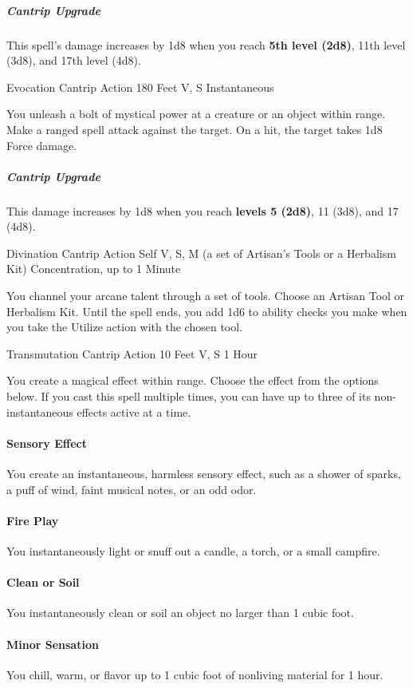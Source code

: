 \documentclass[letterpaper,openany,oneside,twocolumn]{book}
\begin{document}
\subparagraph*{Cantrip Upgrade} This spell's damage increases by 1d8 when you reach \textbf{5th level (2d8)}, 11th level (3d8), and 17th level (4d8).

	{Evocation Cantrip}
	{Action}
	{180 Feet}
	{V, S}
	{Instantaneous}

You unleash a bolt of mystical power at a creature or an object within range. Make a ranged spell attack against the target. On a hit, the target takes 1d8 Force damage.

\subparagraph*{Cantrip Upgrade} This damage increases by 1d8 when you reach \textbf{levels 5 (2d8)}, 11 (3d8), and 17 (4d8).

	{Divination Cantrip}
	{Action}
	{Self}
	{V, S, M (a set of Artisan's Tools or a Herbalism Kit)}
	{Concentration, up to 1 Minute}

You channel your arcane talent through a set of tools. Choose an Artisan Tool or Herbalism Kit. Until the spell ends, you add 1d6 to ability checks you make when you take the Utilize action with the chosen tool.

	{Transmutation Cantrip}
	{Action}
	{10 Feet}
	{V, S}
	{1 Hour}

You create a magical effect within range. Choose the effect from the options below. If you cast this spell multiple times, you can have up to three of its non-instantaneous effects active at a time.

\paragraph*{Sensory Effect} You create an instantaneous, harmless sensory effect, such as a shower of sparks, a puff of wind, faint musical notes, or an odd odor.

\paragraph*{Fire Play} You instantaneously light or snuff out a candle, a torch, or a small campfire.

\paragraph*{Clean or Soil} You instantaneously clean or soil an object no larger than 1 cubic foot.

\paragraph*{Minor Sensation} You chill, warm, or flavor up to 1 cubic foot of nonliving material for 1 hour.
\end{document}
